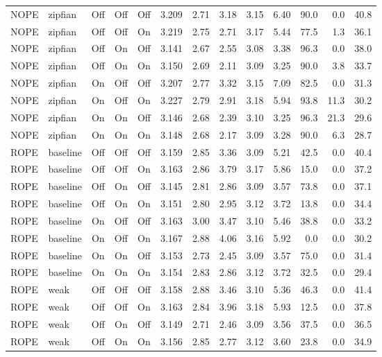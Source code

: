 \begin{longtable}{llcccrrrrrrrr}
NOPE & zipfian & Off & Off & Off & 3.209 & 2.71 & 3.18 & 3.15 & 6.40 & 90.0 & 0.0 & 40.8 \\
NOPE & zipfian & Off & Off & On & 3.219 & 2.75 & 2.71 & 3.17 & 5.44 & 77.5 & 1.3 & 36.1 \\
NOPE & zipfian & Off & On & Off & 3.141 & 2.67 & 2.55 & 3.08 & 3.38 & 96.3 & 0.0 & 38.0 \\
NOPE & zipfian & Off & On & On & 3.150 & 2.69 & 2.11 & 3.09 & 3.25 & 90.0 & 3.8 & 33.7 \\
NOPE & zipfian & On & Off & Off & 3.207 & 2.77 & 3.32 & 3.15 & 7.09 & 82.5 & 0.0 & 31.3 \\
NOPE & zipfian & On & Off & On & 3.227 & 2.79 & 2.91 & 3.18 & 5.94 & 93.8 & 11.3 & 30.2 \\
NOPE & zipfian & On & On & Off & 3.146 & 2.68 & 2.39 & 3.10 & 3.25 & 96.3 & 21.3 & 29.6 \\
NOPE & zipfian & On & On & On & 3.148 & 2.68 & 2.17 & 3.09 & 3.28 & 90.0 & 6.3 & 28.7 \\
ROPE & baseline & Off & Off & Off & 3.159 & 2.85 & 3.36 & 3.09 & 5.21 & 42.5 & 0.0 & 40.4 \\
ROPE & baseline & Off & Off & On & 3.163 & 2.86 & 3.79 & 3.17 & 5.86 & 15.0 & 0.0 & 37.2 \\
ROPE & baseline & Off & On & Off & 3.145 & 2.81 & 2.86 & 3.09 & 3.57 & 73.8 & 0.0 & 37.1 \\
ROPE & baseline & Off & On & On & 3.151 & 2.80 & 2.95 & 3.12 & 3.72 & 13.8 & 0.0 & 34.4 \\
ROPE & baseline & On & Off & Off & 3.163 & 3.00 & 3.47 & 3.10 & 5.46 & 38.8 & 0.0 & 33.2 \\
ROPE & baseline & On & Off & On & 3.167 & 2.88 & 4.06 & 3.16 & 5.92 & 0.0 & 0.0 & 30.2 \\
ROPE & baseline & On & On & Off & 3.153 & 2.73 & 2.45 & 3.09 & 3.57 & 75.0 & 0.0 & 31.4 \\
ROPE & baseline & On & On & On & 3.154 & 2.83 & 2.86 & 3.12 & 3.72 & 32.5 & 0.0 & 29.4 \\
ROPE & weak & Off & Off & Off & 3.158 & 2.88 & 3.46 & 3.10 & 5.36 & 46.3 & 0.0 & 41.4 \\
ROPE & weak & Off & Off & On & 3.163 & 2.84 & 3.96 & 3.18 & 5.93 & 12.5 & 0.0 & 37.8 \\
ROPE & weak & Off & On & Off & 3.149 & 2.71 & 2.46 & 3.09 & 3.56 & 37.5 & 0.0 & 36.5 \\
ROPE & weak & Off & On & On & 3.156 & 2.85 & 2.77 & 3.12 & 3.60 & 23.8 & 0.0 & 34.9 \\

\end{longtable}
